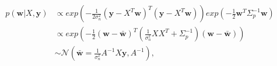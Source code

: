 \begin{equation}
\label{eq:likelihoodprior}
\begin{align*}
p(\mathbf{w} | X, \mathbf{y}) 
& \propto exp(- \frac{1}{2 \sigma_n^2} (\mathbf{y} - X^T \mathbf{w})^T
(\mathbf{y} - X^T \mathbf{w})) exp(- \frac{1}{2} \mathbf{w}^T \Sigma_p^{-1}
\mathbf{w}) \\
& \propto exp(- \frac{1}{2} (\mathbf{w} - \mathbf{\bar{w}})^T (\frac{1}{
\sigma_n^2} X X^T + \Sigma_p^{-1}) (\mathbf{w} - \mathbf{\bar{w}}))  \\
& \sim \mathcal{N}( \mathbf{\bar{w}} = \frac{1}{\sigma_n^2} A^{-1} X
\mathbf{y}, A^{-1}) ,
\end{align*}
\end{equation}
